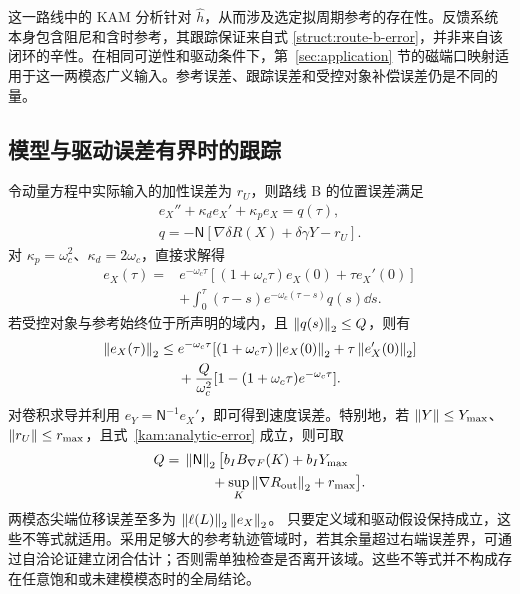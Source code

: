 这一路线中的 KAM 分析针对 $\widehat h$，从而涉及选定拟周期参考的存在性。反馈系统本身包含阻尼和含时参考，其跟踪保证来自式 \eqref{struct:route-b-error}，并非来自该闭环的辛性。在相同可逆性和驱动条件下，第~\ref{sec:application} 节的磁端口映射适用于这一两模态广义输入。参考误差、跟踪误差和受控对象补偿误差仍是不同的量。

\subsection{模型与驱动误差有界时的跟踪}
\label{ss:tracking}

令动量方程中实际输入的加性误差为 $r_U$，则路线 B 的位置误差满足
\[
\begin{gathered}
 e_X''+\kappa_de_X'+\kappa_pe_X=q(\tau),\\
 q=-\mathsf N[\nabla\delta R(X)+\delta\gamma Y-r_U].
\end{gathered}
\]
对 $\kappa_p=\omega_c^2$、$\kappa_d=2\omega_c$，直接求解得
\begin{equation}\label{ss:tracking-convolution}
\begin{aligned}
 e_X(\tau)={}&e^{-\omega_c\tau}
       [(1+\omega_c\tau)e_X(0)+\tau e_X'(0)]\\
 &+\int_0^\tau(\tau-s)e^{-\omega_c(\tau-s)}q(s)\dd s.
\end{aligned}
\end{equation}
若受控对象与参考始终位于所声明的域内，且 $\left\lVert q(s)\right\rVert_2\le Q$，则有
\begin{equation}\label{ss:tracking-bound}
\begin{aligned}
 \left\lVert e_X(\tau)\right\rVert_2\le{}&e^{-\omega_c\tau}
  [(1+\omega_c\tau)\left\lVert e_X(0)\right\rVert_2+\tau\left\lVert e_X'(0)\right\rVert_2]\\
 &+\frac{Q}{\omega_c^2}
       [1-(1+\omega_c\tau)e^{-\omega_c\tau}].
\end{aligned}
\end{equation}
对卷积求导并利用 $e_Y=\mathsf N^{-1}e_X'$，即可得到速度误差。特别地，若 $\left\lVert Y\right\rVert\le Y_{\max}$、$\left\lVert r_U\right\rVert\le r_{\max}$，且式~\eqref{kam:analytic-error} 成立，则可取
\[
\begin{aligned}
 Q={}&\left\lVert\mathsf N\right\rVert_2\bigl[b_I B_{\nabla F}(K)+b_I Y_{\max}\\
     &\qquad+\sup_K\left\lVert\nabla R_{\rm out}\right\rVert_2+r_{\max}\bigr].
\end{aligned}
\]
两模态尖端位移误差至多为
$\left\lVert\ell(L)\right\rVert_2\left\lVert e_X\right\rVert_2$。
只要定义域和驱动假设保持成立，这些不等式就适用。采用足够大的参考轨迹管域时，若其余量超过右端误差界，可通过自洽论证建立闭合估计；否则需单独检查是否离开该域。这些不等式并不构成存在任意饱和或未建模模态时的全局结论。


